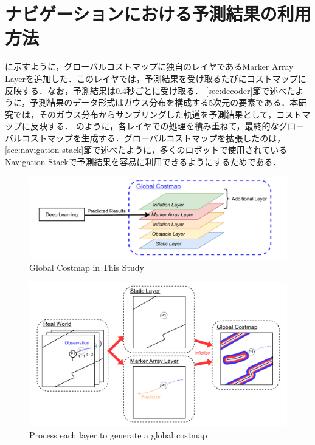 \section{ナビゲーションにおける予測結果の利用方法}\label{sec:nav-usage}
に示すように，グローバルコストマップに独自のレイヤであるMarker Array Layerを追加した．このレイヤでは，予測結果を受け取るたびにコストマップに反映する．なお，予測結果は0.4秒ごとに受け取る．
\ref{sec:decoder}節で述べたように，予測結果のデータ形式はガウス分布を構成する5次元の要素である．本研究では，そのガウス分布からサンプリングした軌道を予測結果として，コストマップに反映する．
のように，各レイヤでの処理を積み重ねて，最終的なグローバルコストマップを生成する．グローバルコストマップを拡張したのは，\ref{sec:navigation-stack}節で述べたように，多くのロボットで使用されているNavigation Stackで予測結果を容易に利用できるようにするためである．

\begin{figure}[H]
  \centering
 \includegraphics[keepaspectratio, scale=0.7]
      {images/layer.pdf}
\caption{Global Costmap in This Study}
 \label{Fig:global-costmap}
\end{figure} 

\begin{figure}[H]
  \centering
 \includegraphics[keepaspectratio, scale=0.47]
      {images/costmap-image.pdf}
\caption{Process each layer to generate a global costmap}
 \label{Fig:costmap-flow}
\end{figure} 


\newpage
